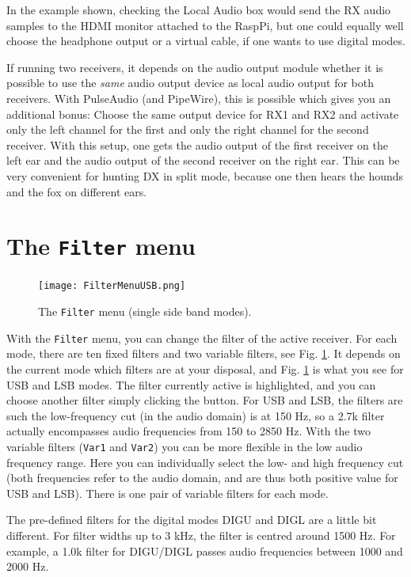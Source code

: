 \documentclass[12pt]{book}
\def\bltt#1{\texttt{\color{blue}#1}}
\begin{document}
In the example shown, checking the Local Audio box would send the RX audio
samples to the HDMI monitor attached to the RaspPi, but one could equally
well choose the headphone output or a virtual cable, if one wants to use
digital modes.

If running two receivers, it depends on the audio output module whether
it is possible to use the \textit{same} audio output device as local audio output
for both receivers. With PulseAudio (and PipeWire), this is possible which gives you an additional
bonus:
Choose the same output device for RX1 and RX2 and activate only
the left channel for the first and only the right channel for the second receiver.
With this setup,
one gets the audio output of the first receiver on the left ear and the audio output of
the second receiver on the right ear. This can be very convenient for hunting DX in split mode,
because one then hears the hounds and the fox on different ears.

\section{The \texttt{Filter} menu}

\begin{figure}[ht]
\center
\texttt{[image: FilterMenuUSB.png]}
\caption{The \bltt{Filter} menu (single side band modes).}
\label{fig:FilterMenuUSB}
\end{figure}

With the \bltt{Filter} menu, you can change the filter of the active receiver. For each mode,
there
are ten fixed filters and two variable filters, see Fig. \ref{fig:FilterMenuUSB}. It
depends on the current mode which filters are at your disposal, and Fig. \ref{fig:FilterMenuUSB}
is what you see for USB and LSB modes. The filter currently active is highlighted, and
you can choose another filter simply clicking the button. For USB and LSB, the filters
are such the low-frequency cut (in the audio domain) is at 150 Hz, so a 2.7k filter
actually encompasses audio frequencies from 150 to 2850 Hz. With the two variable filters
(\texttt{Var1} and \texttt{Var2}) you can be more flexible in the low audio frequency range. Here you
can individually select the low- and high frequency cut (both frequencies refer to
the audio domain, and are thus both positive value for USB and LSB). There is one pair of
variable filters for each mode.

The pre-defined filters for the digital modes DIGU and DIGL are a little bit different.
For filter widths up to 3 kHz, the filter is centred around 1500 Hz. For example,
a 1.0k filter for DIGU/DIGL passes audio frequencies between 1000 and 2000 Hz.
\end{document}

